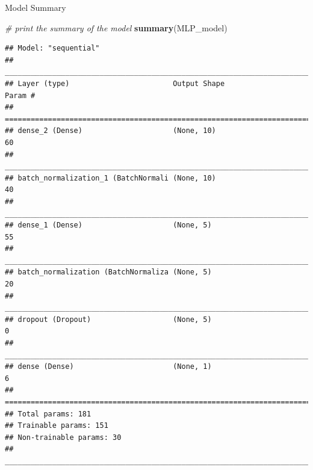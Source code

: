 \documentclass[12pt,ignorenonframetext,]{beamer}
\newenvironment{Shaded}{\begin{snugshade}}{\end{snugshade}}
\newcommand{\CommentTok}[1]{\textcolor[rgb]{0.56,0.35,0.01}{\textit{#1}}}
\newcommand{\KeywordTok}[1]{\textcolor[rgb]{0.13,0.29,0.53}{\textbf{#1}}}
\newcommand{\NormalTok}[1]{#1}
\begin{document}
\begin{frame}[fragile]{Model Summary}
\protect\hypertarget{model-summary}{}

\tiny

\begin{Shaded}
\begin{Highlighting}[]
\CommentTok{# print the summary of the model}
\KeywordTok{summary}\NormalTok{(MLP_model)}
\end{Highlighting}
\end{Shaded}

\begin{verbatim}
## Model: "sequential"
## ________________________________________________________________________________
## Layer (type)                        Output Shape                    Param #     
## ================================================================================
## dense_2 (Dense)                     (None, 10)                      60          
## ________________________________________________________________________________
## batch_normalization_1 (BatchNormali (None, 10)                      40          
## ________________________________________________________________________________
## dense_1 (Dense)                     (None, 5)                       55          
## ________________________________________________________________________________
## batch_normalization (BatchNormaliza (None, 5)                       20          
## ________________________________________________________________________________
## dropout (Dropout)                   (None, 5)                       0           
## ________________________________________________________________________________
## dense (Dense)                       (None, 1)                       6           
## ================================================================================
## Total params: 181
## Trainable params: 151
## Non-trainable params: 30
## ________________________________________________________________________________
\end{verbatim}

\normalsize

\end{frame}
\end{document}

